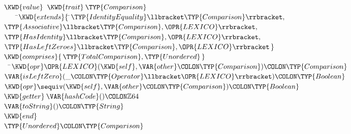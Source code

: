 \begin{Fortress}
\(\KWD{value}\;\;\KWD{trait}\:\TYP{Comparison}\)\\
{\tt~~~~}\pushtabs\=\+\(    \KWD{extends} \{\, \null\)\pushtabs\=\+\(\TYP{IdentityEquality}\llbracket\TYP{Comparison}\rrbracket,\)\\
\(              \TYP{Associative}\llbracket\TYP{Comparison},\OPR{LEXICO}\rrbracket,\)\\
\(              \TYP{HasIdentity}\llbracket\TYP{Comparison},\OPR{LEXICO}\rrbracket,\)\\
\(              \TYP{HasLeftZeroes}\llbracket\TYP{Comparison},\OPR{LEXICO}\rrbracket\,\}\)\-\\\poptabs
\(    \KWD{comprises} \{\,\TYP{TotalComparison}, \TYP{Unordered}\,\}\)\-\\\poptabs
{\tt~~}\pushtabs\=\+\(  \KWD{opr} \mathord{\OPR{LEXICO}}(\KWD{self}, \VAR{other}\COLON \TYP{Comparison})\COLON \TYP{Comparison}\)\\
\(  \VAR{isLeftZero}(\_\COLON \TYP{Operator}\llbracket\OPR{LEXICO}\rrbracket)\COLON \TYP{Boolean}\)\\
\(  \KWD{opr} \mathord{\sequiv}(\KWD{self}, \VAR{other}\COLON \TYP{Comparison})\COLON \TYP{Boolean}\)\\
\(  \KWD{getter}\:\VAR{hashCode}()\COLON \mathbb{Z}64\)\\
\(  \VAR{toString}()\COLON \TYP{String}\)\-\\\poptabs
\(\KWD{end}\)\\[4pt]
\(\TYP{Unordered}\COLON \TYP{Comparison}\)
\end{Fortress}



